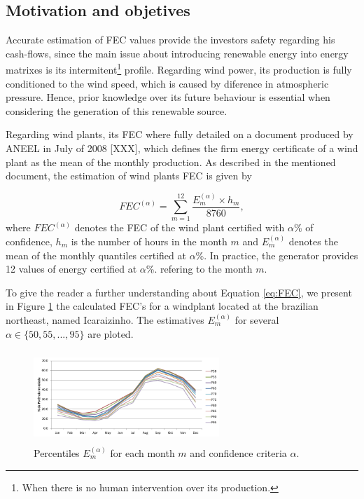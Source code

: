 \documentclass[a4paper]{IEEEtran}
\begin{document}
\subsection{Motivation and objetives}
Accurate estimation of FEC values provide the investors safety regarding his cash-flows, since the main issue about introducing renewable energy into energy matrixes is its intermitent\footnote{When there is no human intervention over its production.} profile. Regarding wind power, its production is fully conditioned to the wind speed, which is caused by diference in atmospheric pressure. Hence, prior knowledge over its future behaviour is essential when considering the generation of this renewable source.

Regarding wind plants, its FEC where fully detailed on a document produced by ANEEL in July of 2008 [XXX], which defines the firm energy certificate of a wind plant as the mean of the monthly production. As described in the mentioned document, the estimation of wind plants FEC is given by

\begin{equation} 
FEC^{(\alpha)} =\sum_{m=1}^{12} \frac{E_m^{(\alpha)} \times h_m}{8760}, \label{eq:FEC}
\end{equation}					
\noindent
where $FEC^{(\alpha)}$ denotes the FEC of the wind plant certified with $\alpha$\% of confidence, ${h_m}$ is the number of hours in the month ${m}$ and $E_m^{(\alpha)}$ denotes the mean of the monthly quantiles certified at $\alpha$\%. In practice, the generator provides 12 values of energy certified at $\alpha$\%. refering to the month $m$. 

To give the reader a further understanding about Equation \eqref{eq:FEC}, we present in Figure \ref{percentiles_FEC} the calculated FEC's for a windplant located at the brazilian northeast, named Icaraizinho. The estimatives $E_m^{(\alpha)}$ for several $\alpha \in \{50,55,...,95\}$ are ploted.


\begin{figure}[H]
\centering
\includegraphics[height=3.5cm,width=7cm]{Figures/GF_SIM.pdf}
\caption{Percentiles $E_m^{(\alpha)}$ for each month $m$ and confidence criteria $\alpha$.}
\label{percentiles_FEC}
\end{figure}
\end{document}
